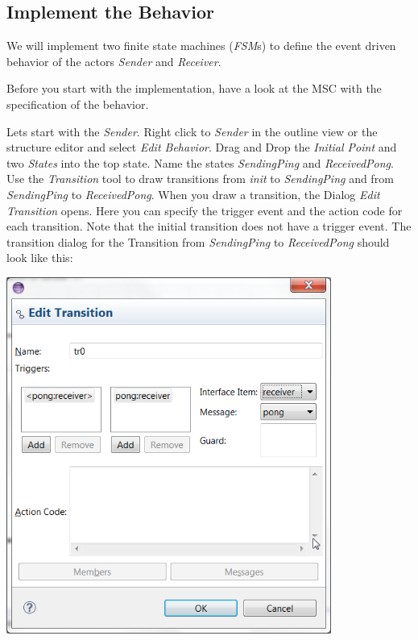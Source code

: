 \subsection{Implement the Behavior}

We will implement two finite state machines (\emph{FSM}s) to  define the event driven behavior of the actors  \emph{Sender} and \emph{Receiver}.

Before you start with the implementation, have a look at the MSC with the specification of the behavior.

Lets start with the \emph{Sender}. Right click to \emph{Sender} in the outline view or the structure editor and select \emph{Edit Behavior}.
Drag and Drop the \textit{Initial Point} and two \textit{States} into the top state. Name the states 
\textit{SendingPing} and \textit{ReceivedPong}. 
Use the \textit{Transition} tool to draw transitions from \textit{init} to \textit{SendingPing} and from \textit{SendingPing} to \textit{ReceivedPong}.
When you draw a transition, the Dialog \emph{Edit Transition} opens. Here you can specify the trigger event and the action code for each transition. Note that the initial transition does not have a trigger event.
The transition dialog for the Transition from \textit{SendingPing} to \textit{ReceivedPong} should look like this:

\includegraphics[width=0.8\textwidth]{images/017-10-Edit-Transition.png}

